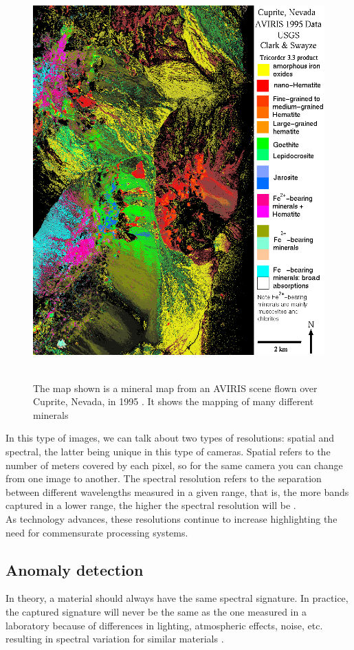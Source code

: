 \begin{figure}[h!]
\centering
\includegraphics[height=6in]{figures/cuprite.png}
\caption[AVIRIS image of Cuprite, Nevada]{The map shown is a mineral map from an AVIRIS scene flown over Cuprite, Nevada, in 1995 \citep{noauthor_aviris_nodate}. It shows the mapping of many different minerals}
  \label{fig:cuprite}
\end{figure}
\clearpage


In this type of images, we can talk about two types of resolutions: spatial and spectral, the latter being unique in this type of cameras. Spatial refers to the number of meters covered by each pixel, so for the same camera you can change from one image to another. The spectral resolution refers to the separation between different wavelengths measured in a given range, that is, the more bands captured in a lower range, the higher the spectral resolution will be \cite{amigo_chapter_2020}.
\\

As technology advances, these resolutions continue to increase highlighting the need for commensurate processing systems.

\subsection{Anomaly detection}
In theory, a material should always have the same spectral signature. In practice, the captured signature will never be the same as the one measured in a laboratory because of differences in lighting, atmospheric effects, noise, etc. resulting in spectral variation for similar materials \cite{borsoi_spectral_2020}.

